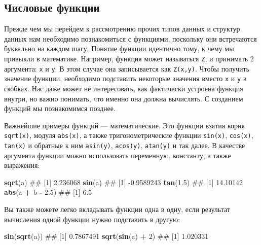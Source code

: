 \documentclass[]{book}
\newenvironment{Shaded}{\begin{snugshade}}{\end{snugshade}}
\newcommand{\KeywordTok}[1]{\textcolor[rgb]{0.13,0.29,0.53}{\textbf{#1}}}
\newcommand{\DecValTok}[1]{\textcolor[rgb]{0.00,0.00,0.81}{#1}}
\newcommand{\FloatTok}[1]{\textcolor[rgb]{0.00,0.00,0.81}{#1}}
\newcommand{\StringTok}[1]{\textcolor[rgb]{0.31,0.60,0.02}{#1}}
\newcommand{\OperatorTok}[1]{\textcolor[rgb]{0.81,0.36,0.00}{\textbf{#1}}}
\newcommand{\NormalTok}[1]{#1}
\begin{document}
\subsection{Числовые функции}\label{number_functions}

Прежде чем мы перейдем к рассмотрению прочих типов данных и структур
данных нам необходимо познакомиться с функциями, поскольку они
встречаются буквально на каждом шагу. Понятие функции идентично тому, к
чему мы привыкли в математике. Например, функция может называться
\texttt{Z}, и принимать 2 аргумента: \texttt{x} и \texttt{y}. В этом
случае она записывается как \texttt{Z(x,y)}. Чтобы получить значение
функции, необходимо подставить некоторые значения вместо \texttt{x} и
\texttt{y} в скобках. Нас даже может не интересовать, как фактически
устроена функция внутри, но важно понимать, что именно она должна
вычислять. С созданием функций мы познакомимся позднее.

Важнейшие примеры функций --- математические. Это функции взятия корня
\texttt{sqrt(x)}, модуля \texttt{abs(x)}, а также тригонометрические
функции \texttt{sin(x)}, \texttt{cos(x)}, \texttt{tan(x)} и обратные к
ним \texttt{asin(y)}, \texttt{acos(y)}, \texttt{atan(y)} и так далее. В
качестве аргумента функции можно использовать переменную, константу, а
также выражения:

\begin{Shaded}
\begin{Highlighting}[]
\KeywordTok{sqrt}\NormalTok{(a)}
\NormalTok{## [1] 2.236068}
\KeywordTok{sin}\NormalTok{(a)}
\NormalTok{## [1] -0.9589243}
\KeywordTok{tan}\NormalTok{(}\FloatTok{1.5}\NormalTok{)}
\NormalTok{## [1] 14.10142}
\KeywordTok{abs}\NormalTok{(a }\OperatorTok{+}\StringTok{ }\NormalTok{b }\OperatorTok{-}\StringTok{ }\FloatTok{2.5}\NormalTok{)}
\NormalTok{## [1] 6.5}
\end{Highlighting}
\end{Shaded}

Вы также можете легко вкладывать функции одна в одну, если результат
вычисления одной функции нужно подставить в другую:

\begin{Shaded}
\begin{Highlighting}[]
\KeywordTok{sin}\NormalTok{(}\KeywordTok{sqrt}\NormalTok{(a))}
\NormalTok{## [1] 0.7867491}
\KeywordTok{sqrt}\NormalTok{(}\KeywordTok{sin}\NormalTok{(a) }\OperatorTok{+}\StringTok{ }\DecValTok{2}\NormalTok{)}
\NormalTok{## [1] 1.020331}
\end{Highlighting}
\end{Shaded}
\end{document}
